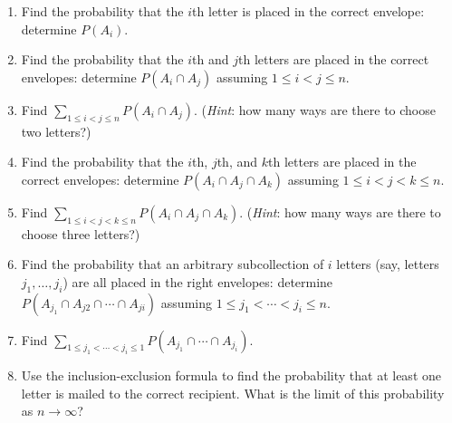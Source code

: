 \documentclass[
  letterpaper,
  DIV=11,
  numbers=noendperiod]{scrartcl}
\providecommand{\tightlist}{%
  \setlength{\itemsep}{0pt}\setlength{\parskip}{0pt}}\usepackage{longtable,booktabs,array}
\begin{document}
\begin{enumerate}
  \begin{enumerate}
  \def\labelenumii{\roman{enumii}.}
  \tightlist
  \item
    Find the probability that the \(i\)th letter is placed in the
    correct envelope: determine \(P(A_i)\).
  \item
    Find the probability that the \(i\)th and \(j\)th letters are placed
    in the correct envelopes: determine \(P(A_i \cap A_j)\) assuming
    \(1 \leq i < j \leq n\).
  \item
    Find \(\sum_{1 \leq i < j \leq n} P(A_i \cap A_j)\). (\emph{Hint}:
    how many ways are there to choose two letters?)
  \item
    Find the probability that the \(i\)th, \(j\)th, and \(k\)th letters
    are placed in the correct envelopes: determine
    \(P(A_i \cap A_j \cap A_k)\) assuming \(1 \leq i < j < k \leq n\).
  \item
    Find \(\sum_{1 \leq i < j < k \leq n} P(A_i \cap A_j \cap A_k)\).
    (\emph{Hint}: how many ways are there to choose three letters?)
  \item
    Find the probability that an arbitrary subcollection of \(i\)
    letters (say, letters \(j_1, \dots, j_i\)) are all placed in the
    right envelopes: determine
    \(P(A_{j_1}\cap A_{j2} \cap \cdots \cap A_{ji})\) assuming
    \(1 \leq j_1 < \cdots < j_i \leq n\).
  \item
    Find
    \(\sum_{1 \leq j_1 < \cdots < j_i \leq 1} P(A_{j_1} \cap \cdots \cap A_{j_i})\).
  \item
    Use the inclusion-exclusion formula to find the probability that at
    least one letter is mailed to the correct recipient. What is the
    limit of this probability as \(n \rightarrow \infty\)?
  \end{enumerate}
\end{enumerate}
\end{document}
